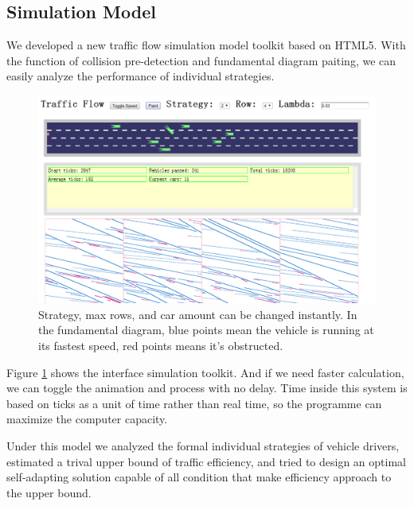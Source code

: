 \subsection{Simulation Model}
We developed a new traffic flow simulation model toolkit based on HTML5. With the function of collision pre-detection and fundamental diagram paiting, we can easily analyze the performance of individual strategies. 
\begin{figure}[H]
  \centering
  \includegraphics[width=.6\textwidth]{./img/simulationmodel.png}
  \caption{Strategy, max rows, and car amount can be changed instantly. In the fundamental diagram, blue points mean the vehicle is running at its fastest speed, red points means it's obstructed. }
  \label{fig:simulationmodel}
\end{figure}
Figure \ref{fig:simulationmodel} shows the interface simulation toolkit. And if we need faster calculation, we can toggle the animation and process with no delay. Time inside this system is based on ticks as a unit of time rather than real time, so the programme can maximize the computer capacity. 

Under this model we analyzed the formal individual strategies of vehicle drivers, estimated a trival upper bound of traffic efficiency, and tried to design an optimal self-adapting solution capable of all condition that make efficiency approach to the upper bound. 


